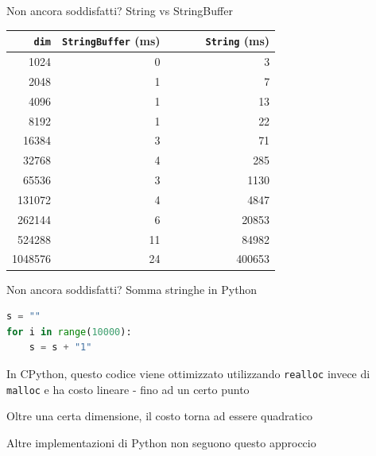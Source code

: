 \begin{frame}{Non ancora soddisfatti? String vs StringBuffer}

\begin{center}
\begin{tabular}{|r|r|r|}
\hline
\texttt{dim} & \texttt{StringBuffer} (ms) & \texttt{\ \ \ \ \ \ String} (ms)\\
\hline
1024 & 0 & 3 \\
2048 & 1 & 7 \\  
4096 & 1 & 13 \\
8192 & 1 & 22 \\
16384 & 3 & 71 \\
32768 & 4 & 285 \\
65536 & 3 & 1130 \\
131072 & 4 & 4847 \\
262144 & 6 & 20853 \\
524288 & 11 & 84982 \\
1048576 & 24 & 400653 \\
\hline
\end{tabular}
\end{center}

\end{frame}

\begin{frame}[fragile]{Non ancora soddisfatti? Somma stringhe in Python}

\vspace{-9pt}
\begin{myboxtitle}[Esempio]
\vspace{-9pt}
\begin{lstlisting}[language=python]
s = ""
for i in range(10000):
    s = s + "1"
\end{lstlisting}
\vspace{-9pt}
\end{myboxtitle}

\bigskip
\BIL
\item In CPython, questo codice viene ottimizzato utilizzando \texttt{realloc} invece di \texttt{malloc} e ha costo lineare - fino ad un certo punto
\item Oltre una certa dimensione, il costo torna ad essere quadratico
\item Altre implementazioni di Python non seguono questo approccio
\EIL


\end{frame}




